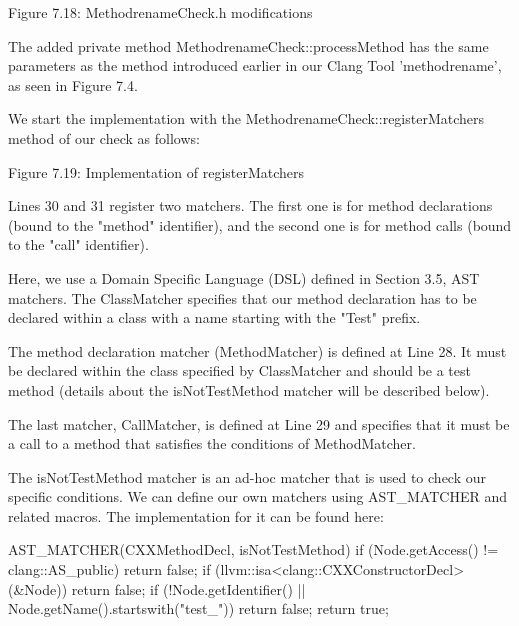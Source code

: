 \begin{center}
Figure 7.18: MethodrenameCheck.h modifications
\end{center}


The added private method MethodrenameCheck::processMethod has the same parameters as the method introduced earlier in our Clang Tool 'methodrename', as seen in Figure 7.4.

We start the implementation with the MethodrenameCheck::registerMatchers method of our check as follows:


\begin{center}
Figure 7.19: Implementation of registerMatchers
\end{center}

Lines 30 and 31 register two matchers. The first one is for method declarations (bound to the "method" identifier), and the second one is for method calls (bound to the "call" identifier).

Here, we use a Domain Specific Language (DSL) defined in Section 3.5, AST matchers. The ClassMatcher specifies that our method declaration has to be declared within a class with a name starting with the "Test" prefix.

The method declaration matcher (MethodMatcher) is defined at Line 28. It must be declared within the class specified by ClassMatcher and should be a test method (details about the isNotTestMethod matcher will be described below).

The last matcher, CallMatcher, is defined at Line 29 and specifies that it must be a call to a method that satisfies the conditions of MethodMatcher.

The isNotTestMethod matcher is an ad-hoc matcher that is used to check our specific conditions. We can define our own matchers using AST\_MATCHER and related macros. The implementation for it can be found here:

\begin{cpp}
AST_MATCHER(CXXMethodDecl, isNotTestMethod) {
  if (Node.getAccess() != clang::AS_public) return false;
  if (llvm::isa<clang::CXXConstructorDecl>(&Node)) return false;
  if (!Node.getIdentifier() || Node.getName().startswith("test_")) return false;
  return true;
}
\end{cpp}

